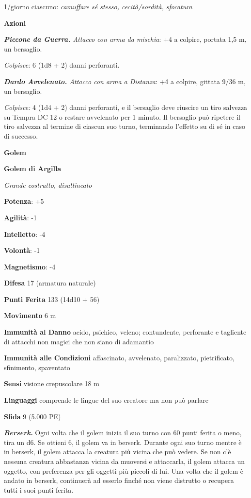 \begin{multicols}{2}
1/giorno ciascuno: \emph{camuffare sé stesso, cecità/sordità, sfocatura}

\textbf{Azioni}

\emph{\textbf{Piccone da Guerra.} Attacco con arma da mischia}: +4 a
colpire, portata 1,5 m, un bersaglio.

\emph{Colpisce:} 6 (1d8 + 2) danni perforanti.

\emph{\textbf{Dardo Avvelenato.} Attacco con arma a Distanza}: +4 a
colpire, gittata 9/36 m, un bersaglio.

\emph{Colpisce:} 4 (1d4 + 2) danni perforanti, e il bersaglio deve
riuscire un tiro salvezza su Tempra DC 12 o restare avvelenato per
1 minuto. Il bersaglio può ripetere il tiro salvezza al termine di
ciascun suo turno, terminando l'effetto su di sé in caso di successo.

\textbf{Golem}

\textbf{Golem di Argilla}

\emph{Grande costrutto, disallineato}

\textbf{Potenza}: +5

\textbf{Agilità}: -1

\textbf{Intelletto}: -4

\textbf{Volontà}: -1

\textbf{Magnetismo}: -4

\textbf{Difesa} 17 (armatura naturale)

\textbf{Punti Ferita} 133 (14d10 + 56)

\textbf{Movimento} 6 m

\textbf{Immunità al Danno} acido, psichico, veleno; contundente,
perforante e tagliente di attacchi non magici che non siano di adamantio

\textbf{Immunità alle Condizioni} affascinato, avvelenato, paralizzato,
pietrificato, sfinimento, spaventato

\textbf{Sensi} visione crepuscolare 18 m

\textbf{Linguaggi} comprende le lingue del suo creatore ma non può
parlare

\textbf{Sfida} 9 (5.000 PE)

\emph{\textbf{Berserk.}} Ogni volta che il golem inizia il suo turno con
60 punti ferita o meno, tira un d6. Se ottieni 6, il golem va in
berserk. Durante ogni suo turno mentre è in berserk, il golem attacca la
creatura più vicina che può vedere. Se non c'è nessuna creatura
abbastanza vicina da muoversi e attaccarla, il golem attacca un oggetto,
con preferenza per gli oggetti più piccoli di lui. Una volta che il
golem è andato in berserk, continuerà ad esserlo finché non viene
distrutto o recupera tutti i suoi punti ferita.


\end{multicols}
